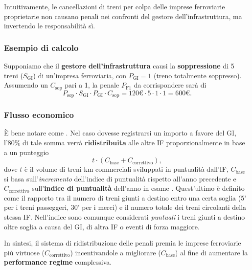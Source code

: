 \documentclass[12pt,a4paper,italian]{report}
\begin{document}
Intuitivamente, le cancellazioni di treni per colpa delle imprese
ferroviarie proprietarie non causano penali nei confronti del gestore
dell'infrastruttura, ma invertendo le responsabilità sì.

\subsubsection{Esempio di calcolo}

Supponiamo che il \textbf{gestore dell'infrastruttura} causi la
\textbf{soppressione} di 5 treni ($S_\text{GI}$) di un'impresa
ferroviaria, con $P_\text{GI} = 1$ (treno totalmente soppresso).
Assumendo un $C_\text{sop}$ pari a 1, la penale $P_\text{F1}$ da
corrispondere sarà di
$$ P_\text{sop} \cdot S_\text{GI} \cdot P_\text{GI} \cdot C_\text{sop}
= 120\text{€} \cdot 5 \cdot 1 \cdot 1 = 600\text{€}.
$$

\subsubsection{Flusso economico}

È bene notare come . Nel caso dovesse registrarsi un importo a favore
del GI, l'80\% di tale somma verrà \textbf{ridistribuita} alle altre
IF proporzionalmente in base a un punteggio
$$
t \cdot (C_\text{base} + C_\text{correttivo}),
$$
dove $t$ è il volume di treni-km commerciali sviluppati in puntualità
dall'IF, $C_\text{base}$ si basa sull'\textit{incremento} dell'indice
di puntualità rispetto all'anno precedente \cite[app.\ 5C, tabella
5a]{RfiPir} e $C_\text{correttivo}$ sull'\textbf{indice di puntualità}
dell'anno in esame \cite[app.\ 5C, tabella 5b]{RfiPir}.  Quest'ultimo
è definito come il rapporto tra il numero di treni giunti a destino
entro una certa soglia (5' per i treni passeggeri, 30' per i merci) e
il numero totale dei treni circolanti della stessa IF\@.  Nell'indice
sono comunque considerati \textit{puntuali} i treni giunti a destino
oltre soglia a causa del GI, di altra IF o eventi di forza maggiore.

In sintesi, il sistema di ridistribuzione delle penali premia le
imprese ferroviarie più virtuose ($C_\text{correttivo}$)
incentivandole a migliorare ($C_\text{base}$) al fine di aumentare la
\textbf{performance regime} complessiva.
\end{document}
